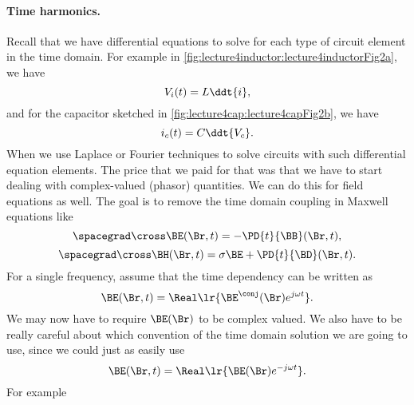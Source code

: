 %
%
\paragraph{Time harmonics.}
%
Recall that we have differential equations to solve for each type of circuit element in the time domain.  For example in \cref{fig:lecture4inductor:lecture4inductorFig2a}, we have
%
\begin{dmath}\label{eqn:emtLecture5:980}
V_i(t) = L \ddt{i},
\end{dmath}
%
%
and for the capacitor sketched in \cref{fig:lecture4cap:lecture4capFig2b}, we have
\begin{dmath}\label{eqn:emtLecture5:1000}
i_c(t) = C \ddt{V_c}.
\end{dmath}
%
%
When we use Laplace or Fourier techniques to solve circuits with such differential equation elements.  The price that we paid for that was that we have to start dealing with complex-valued (phasor) quantities.  We can do this for field equations as well.  The goal is to remove the time domain coupling in Maxwell equations like
%
\begin{dmath}\label{eqn:emtLecture5:460}
\spacegrad \cross \BE(\Br, t) = -\PD{t}{\BB}(\Br, t),
\end{dmath}
\begin{dmath}\label{eqn:emtLecture5:480}
\spacegrad \cross \BH(\Br, t) = \sigma \BE + \PD{t}{\BD}(\Br, t).
\end{dmath}
%
For a single frequency, assume that the time dependency can be written as
%
\begin{dmath}\label{eqn:emtLecture5:500}
\BE(\Br, t) = \Real \lr{ \BE^\conj(\Br) e^{j \omega t} }.
\end{dmath}
%
We may now have to require \( \BE(\Br) \) to be complex valued.
We also have to be really careful about which convention of the time domain solution we are going to use, since we could just as easily use
%
\begin{dmath}\label{eqn:emtLecture5:720}
\BE(\Br, t) = \Real \lr{ \BE(\Br) e^{-j \omega t} }.
\end{dmath}
%
For example
